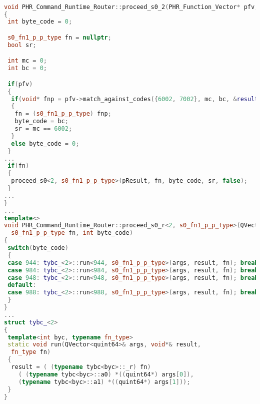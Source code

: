 \begin{lstlisting}[caption={PVM Runtime --- Function Equivalence Classes},
language = C++, numbers = none, label={lst:figPVMrt},
    basicstyle = \ttfamily\bfseries\tiny, linewidth = .95\linewidth] 

void PHR_Command_Runtime_Router::proceed_s0_2(PHR_Function_Vector* pfv, void** pResult)
{
 int byte_code = 0;

 s0_fn1_p_p_type fn = nullptr;
 bool sr;

 int mc = 0;
 int bc = 0;

 if(pfv)
 {
  if(void* fnp = pfv->match_against_codes({6002, 7002}, mc, bc, &result_type_object_))
  {
   fn = (s0_fn1_p_p_type) fnp;
   byte_code = bc;
   sr = mc == 6002;
  }
  else byte_code = 0;
 }
... 
 if(fn)
 {
  proceed_s0<2, s0_fn1_p_p_type>(pResult, fn, byte_code, sr, false);
 }
...
}
...
template<>
void PHR_Command_Runtime_Router::proceed_s0_r<2, s0_fn1_p_p_type>(QVector<quint64>& args, void*& result,
  s0_fn1_p_p_type fn, int byte_code)
{
 switch(byte_code)
 {
 case 944: tybc_<2>::run<944, s0_fn1_p_p_type>(args, result, fn); break;
 case 984: tybc_<2>::run<984, s0_fn1_p_p_type>(args, result, fn); break;
 case 948: tybc_<2>::run<948, s0_fn1_p_p_type>(args, result, fn); break;
 default:
 case 988: tybc_<2>::run<988, s0_fn1_p_p_type>(args, result, fn); break;
 }
}
...
struct tybc_<2>
{
 template<int byc, typename fn_type>
 static void run(QVector<quint64>& args, void*& result,
  fn_type fn)
 {
  result = ( (typename tybc<byc>::_r) fn)
    ( (typename tybc<byc>::a0) *((quint64*) args[0]),  
    (typename tybc<byc>::a1) *((quint64*) args[1]));
 }
}


\end{lstlisting}

